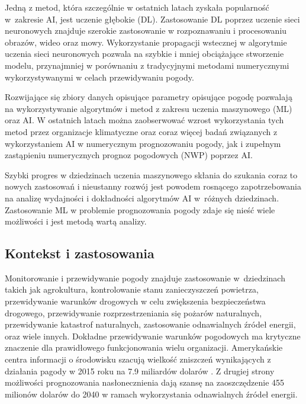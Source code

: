 Jedną z metod, która szczególnie w ostatnich latach zyskała popularność w~zakresie
AI, jest uczenie głębokie (DL). Zastosowanie DL poprzez uczenie sieci neuronowych
znajduje szerokie zastosowanie w rozpoznawaniu i procesowaniu obrazów, wideo oraz
mowy. Wykorzystanie propagacji wstecznej w algorytmie uczenia sieci neuronowych
pozwala na szybkie i mniej obciążające stworzenie modelu, przynajmniej w porównaniu
z tradycyjnymi metodami numerycznymi wykorzystywanymi w celach przewidywaniu pogody.

Rozwijające się zbiory danych opisujące parametry opisujące pogodę 
pozwalają na wykorzystywanie algorytmów i metod z zakresu uczenia maszynowego (ML)
oraz AI. W ostatnich latach można zaobserwować wzrost wykorzystania tych metod
przez organizacje klimatyczne oraz coraz więcej badań związanych z wykorzystaniem
AI w numerycznym prognozowaniu pogody, jak i zupełnym zastąpieniu numerycznych
prognoz pogodowych (NWP) poprzez AI.

Szybki progres w dziedzinach uczenia maszynowego skłania do szukania coraz to nowych
zastosowań i nieustanny rozwój jest powodem rosnącego zapotrzebowania na analizę
wydajności i dokładności algorytmów AI w~różnych dziedzinach. Zastosowanie ML w
problemie prognozowania pogody zdaje się nieść wiele możliwości i jest metodą
wartą analizy. 

\subsection{Kontekst i zastosowania}

Monitorowanie i przewidywanie pogody znajduje zastosowanie w~dziedzinach takich
jak agrokultura, kontrolowanie stanu zanieczyszczeń powietrza, 
przewidywanie warunków drogowych w celu zwiększenia bezpieczeństwa drogowego,
przewidywanie rozprzestrzeniania się pożarów naturalnych,
przewidywanie katastrof naturalnych, zastosowanie odnawialnych źródeł energii,
oraz wiele innych. Dokładne przewidywanie warunków pogodowych ma krytyczne znaczenie
dla prawidłowego funkcjonowania wielu organizacji. Amerykańskie centra
informacji o środowisku szacują wielkość zniszczeń wynikających z działania
pagody w 2015 roku na 7.9 miliardów dolarów \cite{using-artificial-intelligence-to-improve}.
Z drugiej strony możliwości prognozowania nasłonecznienia dają szansę na zaoszczędzenie
455 milionów dolarów do 2040 w ramach wykorzystania odnawialnych źródeł energii.

